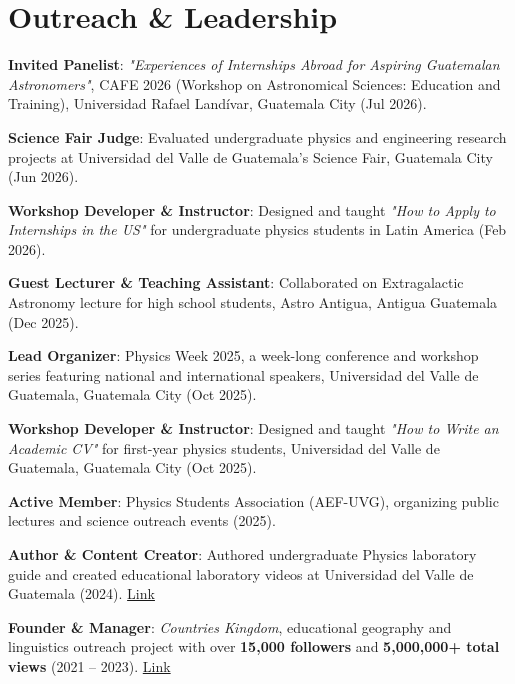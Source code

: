 \section{Outreach \& Leadership}

\begin{onecolentry}
\begin{highlights}
    \item \textbf{Invited Panelist}: \textit{"Experiences of Internships Abroad for Aspiring Guatemalan Astronomers"}, CAFE 2026 (Workshop on Astronomical Sciences: Education and Training), Universidad Rafael Landívar, Guatemala City (Jul 2026).
    \item \textbf{Science Fair Judge}: Evaluated undergraduate physics and engineering research projects at Universidad del Valle de Guatemala's Science Fair, Guatemala City (Jun 2026).
    \item \textbf{Workshop Developer \& Instructor}: Designed and taught \textit{"How to Apply to Internships in the US"} for undergraduate physics students in Latin America (Feb 2026).
    \item \textbf{Guest Lecturer \& Teaching Assistant}: Collaborated on Extragalactic Astronomy lecture for high school students, Astro Antigua, Antigua Guatemala (Dec 2025).
    \item \textbf{Lead Organizer}: Physics Week 2025, a week-long conference and workshop series featuring national and international speakers, Universidad del Valle de Guatemala, Guatemala City (Oct 2025).
    \item \textbf{Workshop Developer \& Instructor}: Designed and taught \textit{"How to Write an Academic CV"} for first-year physics students, Universidad del Valle de Guatemala, Guatemala City (Oct 2025).
    \item \textbf{Active Member}: Physics Students Association (AEF-UVG), organizing public lectures and science outreach events (2025).
    \item \textbf{Author \& Content Creator}: Authored undergraduate Physics laboratory guide and created educational laboratory videos at Universidad del Valle de Guatemala (2024). \href{https://www.youtube.com/watch?v=Q2wZin0FuK0}{Link}
    \item \textbf{Founder \& Manager}: \textit{Countries Kingdom}, educational geography and linguistics outreach project with over \textbf{15,000 followers} and \textbf{5,000,000+ total views} (2021 – 2023). \href{https://www.instagram.com/countries_kingdom/}{Link}
\end{highlights}
\end{onecolentry}
